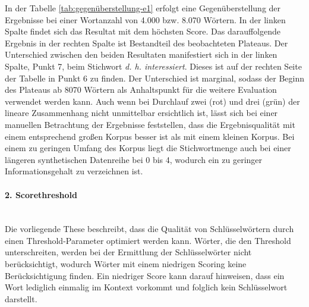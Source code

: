 In der Tabelle \ref{tab:gegenüberstellung-e1} erfolgt eine Gegenüberstellung der Ergebnisse bei einer Wortanzahl von 4.000 bzw. 8.070 Wörtern. In der linken Spalte findet sich das Resultat mit dem höchsten Score. Das darauffolgende Ergebnis in der rechten Spalte ist Bestandteil des beobachteten Plateaus. Der Unterschied zwischen den beiden Resultaten manifestiert sich in der linken Spalte, Punkt 7, beim Stichwort \emph{d. h. interessiert}. Dieses ist auf der rechten Seite der Tabelle in Punkt 6 zu finden. Der Unterschied ist marginal, sodass der Beginn des Plateaus ab 8070 Wörtern als Anhaltspunkt für die weitere Evaluation verwendet werden kann. Auch wenn bei Durchlauf zwei (rot) und drei (grün) der lineare Zusammenhang nicht unmittelbar ersichtlich ist, lässt sich bei einer manuellen Betrachtung der Ergebnisse feststellen, dass die Ergebnisqualität mit einem entsprechend großen Korpus besser ist als mit einem kleinen Korpus. Bei einem zu geringen Umfang des Korpus liegt die Stichwortmenge auch bei einer längeren synthetischen Datenreihe bei 0 bis 4, wodurch ein zu geringer Informationsgehalt zu verzeichnen ist.
\paragraph{2. Scorethreshold}\mbox{}\\
Die vorliegende These beschreibt, dass die Qualität von Schlüsselwörtern durch einen Threshold-Parameter optimiert werden kann. Wörter, die den Threshold unterschreiten, werden bei der Ermittlung der Schlüsselwörter nicht berücksichtigt, wodurch Wörter mit einem niedrigen Scoring keine Berücksichtigung finden. Ein niedriger Score kann darauf hinweisen, dass ein Wort lediglich einmalig im Kontext vorkommt und folglich kein Schlüsselwort darstellt.\\

